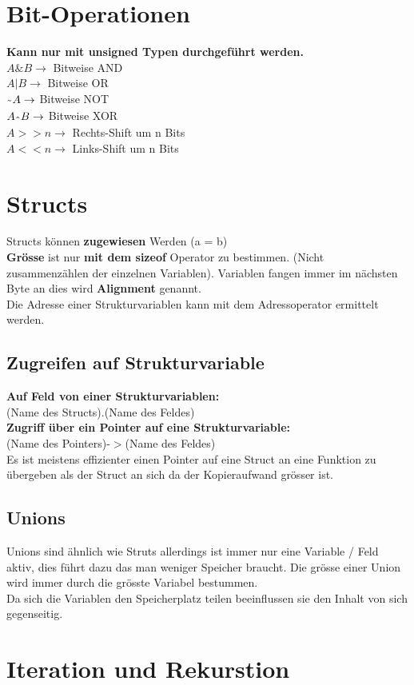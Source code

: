 \documentclass{article}
\begin{document}
\section{Bit-Operationen}
\textbf{Kann nur mit unsigned Typen durchgeführt werden.}\\
$A \& B \rightarrow$ Bitweise AND \\ 
$A | B \rightarrow$ Bitweise OR \\
$ \raisebox{-0.9ex}{\~{ }} A \rightarrow$ Bitweise NOT \\
$A \raisebox{-0.9ex}{\^{}}  B \rightarrow$ Bitweise XOR \\
$A >> n \rightarrow$ Rechts-Shift um n Bits \\
$A << n \rightarrow$ Links-Shift um n Bits
\section{Structs}
Structs können \textbf{zugewiesen} Werden (a = b) \\
\textbf{Grösse} ist nur \textbf{mit dem sizeof} Operator zu bestimmen. (Nicht zusammenzählen der einzelnen Variablen). Variablen fangen immer im nächsten Byte an dies wird \textbf{Alignment} genannt. \\
Die Adresse einer Strukturvariablen kann mit dem Adressoperator ermittelt werden.
\subsection{Zugreifen auf Strukturvariable}
\textbf{Auf Feld von einer Strukturvariablen:} \\
(Name des Structs).(Name des Feldes) \\
\textbf{Zugriff über ein Pointer auf eine Strukturvariable: } \\
(Name des Pointers)-$>$(Name des Feldes) \\
Es ist meistens effizienter einen Pointer auf eine Struct an eine Funktion zu übergeben als der Struct an sich da der Kopieraufwand grösser ist.
\subsection{Unions}
Unions sind ähnlich wie Struts allerdings ist immer nur eine Variable / Feld aktiv, dies führt dazu das man weniger Speicher braucht. Die grösse einer Union wird immer durch die grösste Variabel bestummen. \\
Da sich die Variablen den Speicherplatz teilen beeinflussen sie den Inhalt von sich gegenseitig.
\section{Iteration und Rekurstion}
\end{document}
